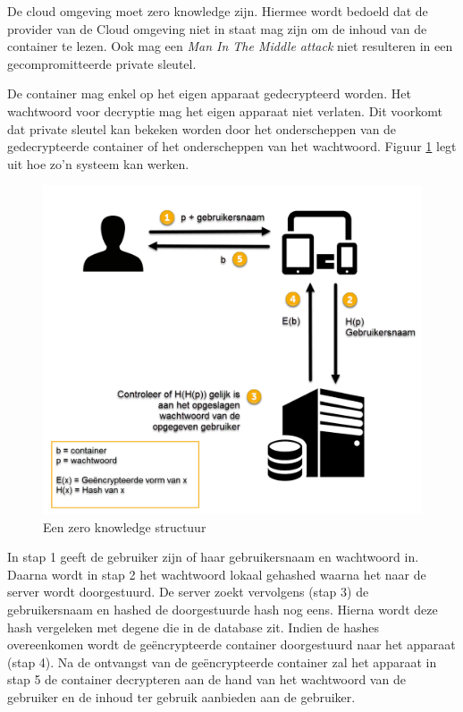 De cloud omgeving moet zero knowledge zijn. Hiermee wordt bedoeld dat de
provider van de Cloud omgeving niet in staat mag zijn om de inhoud van de
container te lezen. Ook mag een \textit{Man In The Middle attack} niet
resulteren in een gecompromitteerde private sleutel.

De container mag enkel op het eigen apparaat gedecrypteerd worden. Het
wachtwoord voor decryptie mag het eigen apparaat niet verlaten. Dit voorkomt dat
private sleutel kan bekeken worden door het onderscheppen van de gedecrypteerde
container of het onderscheppen van het wachtwoord. Figuur
\ref{fig:online-zero-knowledge-container} legt uit hoe zo’n systeem kan werken.

\begin{figure}[H]
	\includegraphics[width=\textwidth,keepaspectratio]{img/encrypted-container-sharing.png}
	\centering
	\caption{Een zero knowledge structuur}
	\label{fig:online-zero-knowledge-container}
\end{figure}

In stap 1 geeft de gebruiker zijn of haar gebruikersnaam en wachtwoord in.
Daarna wordt in stap 2 het wachtwoord lokaal gehashed waarna het naar de server
wordt doorgestuurd. De server zoekt vervolgens (stap 3) de gebruikersnaam en
hashed de doorgestuurde hash nog eens. Hierna wordt deze hash vergeleken met
degene die in de database zit. Indien de hashes overeenkomen wordt de
geëncrypteerde container doorgestuurd naar het apparaat (stap 4). Na de
ontvangst van de geëncrypteerde container zal het apparaat in stap 5 de
container decrypteren aan de hand van het wachtwoord van de gebruiker en de
inhoud ter gebruik aanbieden aan de gebruiker.

